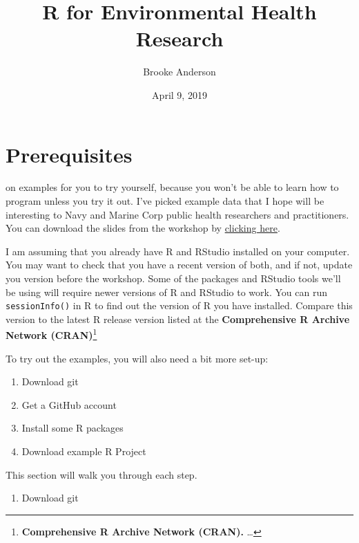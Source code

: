 \documentclass[]{tufte-book}
\title{R for Environmental Health Research}
\author{Brooke Anderson}
\date{April 9, 2019}
\providecommand{\tightlist}{%
  \setlength{\itemsep}{0pt}\setlength{\parskip}{0pt}}
\begin{document}
\maketitle



{
\setcounter{tocdepth}{1}
\tableofcontents
}

\hypertarget{prerequisites}{%
\chapter{Prerequisites}\label{prerequisites}}

 on examples for you to try yourself,
because you
won't be able to learn how to program unless you try it out. I've picked
example data that I hope will be interesting to Navy and Marine Corp public
health researchers and practitioners. You can download the slides from the
workshop by \href{https://github.com/geanders/navy_public_health/raw/master/_workshop_slides/workshop_slides.pdf}{clicking here}.

I am assuming that you already have R and RStudio installed on your computer.
You may want to check that you have a recent version of both, and if not, update
you version before the workshop. Some of the packages and RStudio tools we'll be
using will require newer versions of R and RStudio to work. You can run
\texttt{sessionInfo()} in R to find out the version of R you have installed. Compare this
version to the latest R release version listed at the \textbf{Comprehensive R Archive
Network (CRAN)}\footnote{\textbf{Comprehensive R Archive Network (CRAN).} \ldots{}}

To try out the examples, you will also need a bit more set-up:

\begin{enumerate}
\def\labelenumi{\arabic{enumi}.}
\tightlist
\item
  Download git
\item
  Get a GitHub account
\item
  Install some R packages
\item
  Download example R Project
\end{enumerate}

This section will walk you through each step.

\begin{enumerate}
\def\labelenumi{\arabic{enumi}.}
\tightlist
\item
  Download git
\end{enumerate}
\end{document}
